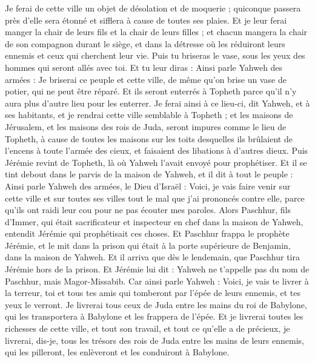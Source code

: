 \begin{multicols}{2}
Je ferai de cette ville un objet de désolation et de moquerie ; quiconque passera près d'elle sera étonné et sifflera à cause de toutes ses plaies.
Et je leur ferai manger la chair de leurs fils et la chair de leurs filles ; et chacun mangera la chair de son compagnon durant le siège, et dans la détresse où les réduiront leurs ennemis et ceux qui cherchent leur vie.
Puis tu briseras le vase, sous les yeux des hommes qui seront allés avec toi.
Et tu leur diras : Ainsi parle Yahweh des armées : Je briserai ce peuple et cette ville, de même qu'on brise un vase de potier, qui ne peut être réparé. Et ils seront enterrés à Topheth parce qu'il n'y aura plus d'autre lieu pour les enterrer.
Je ferai ainsi à ce lieu-ci, dit Yahweh, et à ses habitants, et je rendrai cette ville semblable à Topheth ;
et les maisons de Jérusalem, et les maisons des rois de Juda, seront impures comme le lieu de Topheth, à cause de toutes les maisons sur les toits desquelles ils brûlaient de l'encens à toute l'armée des cieux, et faisaient des libations à d'autres dieux.
Puis Jérémie revint de Topheth, là où Yahweh l'avait envoyé pour prophétiser. Et il se tint debout dans le parvis de la maison de Yahweh, et il dit à tout le peuple :
Ainsi parle Yahweh des armées, le Dieu d'Israël : Voici, je vais faire venir sur cette ville et sur toutes ses villes tout le mal que j'ai prononcés contre elle, parce qu'ils ont raidi leur cou pour ne pas écouter mes paroles.
\VerseOne{}Alors Paschhur, fils d'Immer, qui était sacrificateur et inspecteur en chef dans la maison de Yahweh, entendit Jérémie qui prophétisait ces choses.
Et Paschhur frappa le prophète Jérémie, et le mit dans la prison qui était à la porte supérieure de Benjamin, dans la maison de Yahweh.
Et il arriva que dès le lendemain, que Paschhur tira Jérémie hors de la prison. Et Jérémie lui dit : Yahweh ne t'appelle pas du nom de Paschhur, mais Magor-Missabib.
Car ainsi parle Yahweh : Voici, je vais te livrer à la terreur, toi et tous tes amis qui tomberont par l'épée de leurs ennemis, et tes yeux le verront. Je livrerai tous ceux de Juda entre les mains du roi de Babylone, qui les transportera à Babylone et les frappera de l'épée.
Et je livrerai toutes les richesses de cette ville, et tout son travail, et tout ce qu'elle a de précieux, je livrerai, dis-je, tous les trésors des rois de Juda entre les mains de leurs ennemis, qui les pilleront, les enlèveront et les conduiront à Babylone.

\end{multicols}
